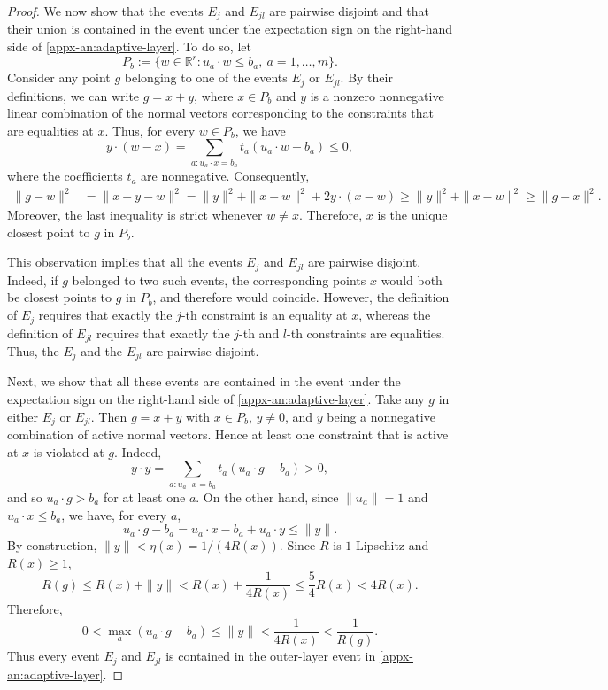 \documentclass[11pt,letterpaper]{article}
\theoremstyle{remark}
\newcommand{\R}{\mathbb R}
\begin{document}
\begin{proof}
We now show that the events \(E_j\) and
\(E_{jl}\) are pairwise disjoint and that their union is
contained in the event under the expectation sign on the right-hand side of
\eqref{appx-an:adaptive-layer}.
To do so, let
\[
P_b:=\{w\in\R^r:u_a\cdot w\le b_a,\ a=1,\dots,m\}.
\]
Consider any point \(g\) belonging to one of the events
\(E_j\) or \(E_{jl}\). By their definitions, we can write
\(g=x+y\), where \(x\in P_b\) and \(y\) is a nonzero
nonnegative linear combination of the normal vectors corresponding
to the constraints that are equalities at \(x\).
Thus, for every \(w\in P_b\), we have
\[
y\cdot(w-x)
=\sum_{a:u_a\cdot x=b_a}t_a(u_a\cdot w-b_a)
\le0,
\]
where the coefficients \(t_a\) are nonnegative. Consequently,
\[
\begin{aligned}
\|g-w\|^2
&=\|x+y-w\|^2=\|y\|^2+\|x-w\|^2+2y\cdot(x-w)\ge\|y\|^2+\|x-w\|^2
\ge\|g-x\|^2.
\end{aligned}
\]
Moreover, the last inequality is strict whenever \(w\ne x\).
Therefore, \(x\) is the unique closest point to \(g\) in \(P_b\).

This observation implies that all the events \(E_j\) and
\(E_{jl}\) are pairwise disjoint. Indeed, if \(g\) belonged
to two such events, the corresponding points \(x\) would
both be closest points to \(g\) in \(P_b\), and therefore
would coincide. However, the definition of \(E_j\) requires
that exactly the \(j\)-th constraint is an equality at \(x\),
whereas the definition of \(E_{jl}\) requires that exactly
the \(j\)-th and \(l\)-th constraints are equalities. Thus, the $E_j$ and the $E_{jl}$ are pairwise disjoint.

Next, we show that all these events are contained in the event under the expectation sign on the right-hand side of \eqref{appx-an:adaptive-layer}. Take any $g$ in either $E_j$ or $E_{jl}$.
Then \(g=x+y\) with \(x\in P_b\),
\(y\ne0\), and \(y\) being a nonnegative combination of active
normal vectors. Hence at least one constraint that is active at $x$ is violated
at \(g\). Indeed,
\[
y\cdot y
=\sum_{a:u_a\cdot x=b_a}t_a(u_a\cdot g-b_a)>0,
\]
and so \(u_a\cdot g>b_a\) for at least one \(a\).
On the other hand, since \(\|u_a\|=1\) and
\(u_a\cdot x\le b_a\), we have, for every \(a\),
\[
u_a\cdot g-b_a
=u_a\cdot x-b_a+u_a\cdot y
\le\|y\|.
\]
By construction, \(\|y\|<\eta(x)=1/(4R(x))\).
Since \(R\) is \(1\)-Lipschitz and \(R(x)\ge1\),
\[
R(g)\le R(x)+\|y\|
<R(x)+\frac1{4R(x)}
\le\frac54R(x)<4R(x).
\]
Therefore,
\[
0<\max_a(u_a\cdot g-b_a)
\le\|y\|<\frac1{4R(x)}
<\frac1{R(g)}.
\]
Thus every event \(E_j\) and \(E_{jl}\) is contained in
the outer-layer event in \eqref{appx-an:adaptive-layer}.


\end{proof}
\end{document}
